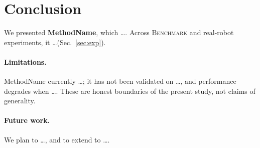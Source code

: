 
\section{Conclusion}
\label{sec:conclusion}

We presented \textbf{MethodName}, which \ldots. Across \textsc{Benchmark} and
real-robot experiments, it \ldots (Sec.~\ref{sec:exp}).

\paragraph{Limitations.} MethodName currently \ldots; it has not been validated on
\ldots, and performance degrades when \ldots. These are honest boundaries of the
present study, not claims of generality.

\paragraph{Future work.} We plan to \ldots, and to extend to \ldots.
